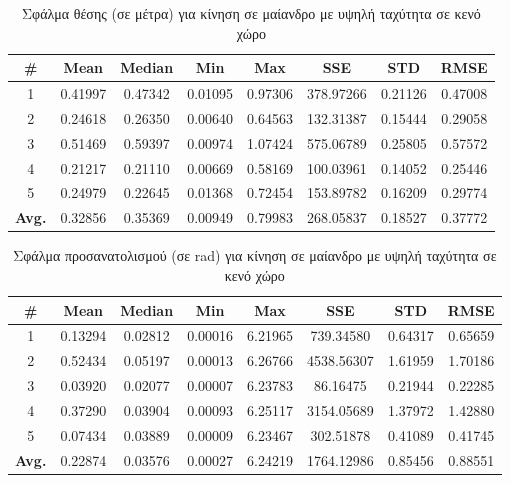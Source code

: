 \begin{table}[H]
    \begin{center}
        \centering
        \caption{Σφάλμα θέσης (σε μέτρα) για κίνηση σε μαίανδρο με υψηλή ταχύτητα σε κενό χώρο}
        \label{tab:position_error_meander_fast_box}
        \begin{tabular}{| c | c | c | c | c | c | c | c | }
        \hline
        \rowcolor{Gray}
        \# & Mean & Median & Min & Max & SSE & STD & RMSE \\
        \hline
        1 & 0.41997 & 0.47342 & 0.01095 & 0.97306 & 378.97266 & 0.21126 & 0.47008 \\
        2 & 0.24618 & 0.26350 & 0.00640 & 0.64563 & 132.31387 & 0.15444 & 0.29058 \\
        3 & 0.51469 & 0.59397 & 0.00974 & 1.07424 & 575.06789 & 0.25805 & 0.57572 \\
        4 & 0.21217 & 0.21110 & 0.00669 & 0.58169 & 100.03961 & 0.14052 & 0.25446 \\
        5 & 0.24979 & 0.22645 & 0.01368 & 0.72454 & 153.89782 & 0.16209 & 0.29774 \\
        \hline
        \textbf{Avg.} & 0.32856 & 0.35369 & 0.00949 & 0.79983 & 268.05837 & 0.18527 & 0.37772 \\
        \hline
        \end{tabular}
    \end{center}
\end{table}

\begin{table}[H]
    \centering
    \caption{Σφάλμα προσανατολισμού (σε rad) για κίνηση σε μαίανδρο με υψηλή ταχύτητα σε κενό χώρο}
    \label{tab:orientation_error_meander_fast_box}
    \begin{tabular}{| c | c | c | c | c | c | c | c | }
        \hline
        \rowcolor{Gray}
        \# & Mean & Median & Min & Max & SSE & STD & RMSE \\
        \hline
        1 & 0.13294 & 0.02812 & 0.00016 & 6.21965 & 739.34580 & 0.64317 & 0.65659 \\
        2 & 0.52434 & 0.05197 & 0.00013 & 6.26766 & 4538.56307 & 1.61959 & 1.70186 \\
        3 & 0.03920 & 0.02077 & 0.00007 & 6.23783 & 86.16475 & 0.21944 & 0.22285 \\
        4 & 0.37290 & 0.03904 & 0.00093 & 6.25117 & 3154.05689 & 1.37972 & 1.42880 \\
        5 & 0.07434 & 0.03889 & 0.00009 & 6.23467 & 302.51878 & 0.41089 & 0.41745 \\
        \hline
        \textbf{Avg.} & 0.22874 & 0.03576 & 0.00027 & 6.24219 & 1764.12986 & 0.85456 & 0.88551 \\
        \hline
    \end{tabular}
\end{table}

